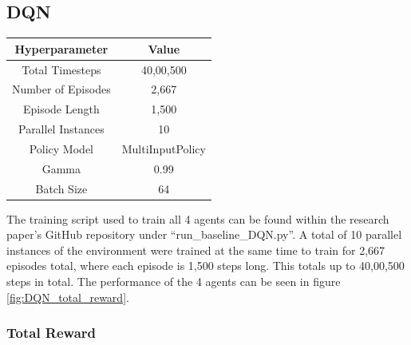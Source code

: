 \subsection{DQN}

\begin{center}
\begin{tabular}{ |c|c| } 
 \hline
 Hyperparameter & Value \\ 
 \hline
 Total Timesteps & 40,00,500 \\
 Number of Episodes &  2,667 \\
 Episode Length & 1,500 \\ 
 Parallel Instances & 10 \\
 Policy Model & MultiInputPolicy \\
 Gamma & 0.99 \\  
 Batch Size & 64 \\
 \hline
\end{tabular}
\end{center}

The training script used to train all 4 agents can be found within the research paper's GitHub repository under ``run\_baseline\_DQN.py''. A total of 10 parallel instances of the environment were trained at the same time to train for 2,667 episodes total, where each episode is 1,500 steps long. This totals up to 40,00,500 steps in total. The performance of the 4 agents can be seen in figure \ref{fig:DQN_total_reward}. 


\subsubsection{Total Reward}

